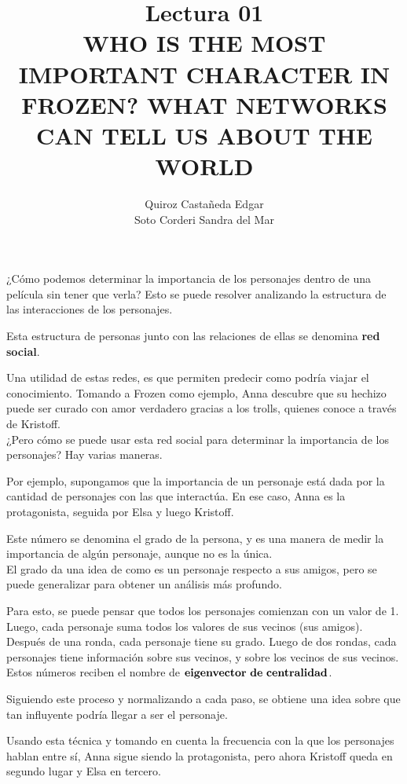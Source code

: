 \documentclass[12pt]{extreport}
\title{Lectura 01\\ WHO IS THE MOST IMPORTANT CHARACTER IN FROZEN? WHAT NETWORKS CAN TELL US ABOUT THE WORLD}
\author{%
	Quiroz Castañeda Edgar \\
	Soto Corderi Sandra del Mar
	 }
\makeatletter
\renewcommand{\maketitle}{\bgroup\setlength{\parindent}{0pt}
	\begin{flushright}
		\@author
	\end{flushright}
	\begin{flushleft}
		\textbf{\@title}
	\end{flushleft}
	\egroup
}
\makeatother
\begin{document}
	\maketitle
	\thispagestyle{empty} %
	
	¿Cómo podemos determinar la importancia de los personajes dentro de una 
	película sin tener que verla? Esto se puede resolver analizando la 
	estructura de las interacciones de los personajes. 
	
	Esta estructura de personas junto con las relaciones de ellas se denomina 
	\textbf{red social}. 
	
	Una utilidad de estas redes, es que permiten predecir como podría viajar el
	conocimiento.
	Tomando a Frozen como ejemplo, Anna descubre que su hechizo puede ser curado 
	con amor verdadero gracias a los trolls, quienes conoce a través de Kristoff.
	\\	

	¿Pero cómo se puede usar esta red social para determinar la importancia de 
	los personajes? Hay varias maneras.

	Por ejemplo, supongamos que la importancia de un personaje está dada por la 
	cantidad de personajes con las que interactúa. En ese caso, Anna es la 
	protagonista, seguida por Elsa y luego Kristoff.

	Este número se denomina el grado de la persona, y es una manera de medir la 
	importancia de algún personaje, aunque no es la única.
	\\

	El grado da una idea de como es un personaje respecto a sus amigos, pero se puede 
	generalizar para obtener un análisis más profundo.

	Para esto, se puede pensar que todos los personajes comienzan con un valor 
	de 1. Luego, cada personaje suma todos los valores de sus vecinos (sus amigos). 
	Después de una ronda, cada personaje tiene su grado. Luego de dos rondas, 
	cada personajes tiene información sobre sus vecinos, y sobre los vecinos de 
	sus vecinos. Estos números reciben el nombre de $\bf{eigenvector\ de\ centralidad}$.
	
	Siguiendo este proceso y normalizando a cada paso, se obtiene una idea sobre
	que tan influyente podría llegar a ser el personaje.
	
	Usando esta técnica y tomando en cuenta la frecuencia con la que los 
	personajes hablan entre sí, Anna sigue siendo la protagonista, pero ahora 
	Kristoff queda en segundo lugar y Elsa en tercero.
	\\
	
\end{document}
